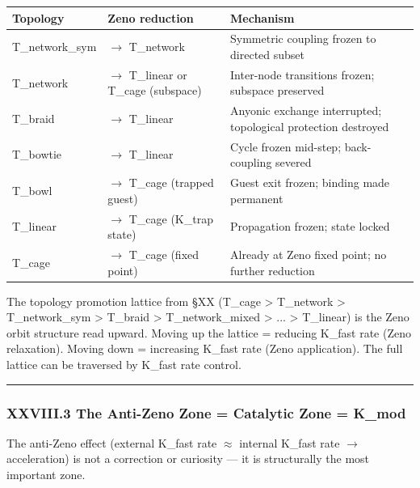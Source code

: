 \documentclass[12pt,a4paper]{article}
\begin{document}
\begin{table}[htbp]
\centering
\small
{}
\begin{tabularx}{\textwidth}{>{\centering\arraybackslash}X >{\centering\arraybackslash}X >{\centering\arraybackslash}X}
\toprule
\rowcolor{gray!25}\textbf{Topology} & \textbf{Zeno reduction} & \textbf{Mechanism} \\
\midrule
\rowcolors{1}{white}{gray!10}
T\_network\_sym & $\rightarrow$ T\_network & Symmetric coupling frozen to directed subset \\
T\_network & $\rightarrow$ T\_linear or T\_cage (subspace) & Inter-node transitions frozen; subspace preserved \\
T\_braid & $\rightarrow$ T\_linear & Anyonic exchange interrupted; topological protection destroyed \\
T\_bowtie & $\rightarrow$ T\_linear & Cycle frozen mid-step; back-coupling severed \\
T\_bowl & $\rightarrow$ T\_cage (trapped guest) & Guest exit frozen; binding made permanent \\
T\_linear & $\rightarrow$ T\_cage (K\_trap state) & Propagation frozen; state locked \\
T\_cage & $\rightarrow$ T\_cage (fixed point) & Already at Zeno fixed point; no further reduction \\
\bottomrule
\end{tabularx}
\end{table}

The topology promotion lattice from §XX (T\_cage \textgreater{} T\_network \textgreater{} T\_network\_sym \textgreater{} T\_braid \textgreater{} T\_network\_mixed \textgreater{} ... \textgreater{} T\_linear) is the Zeno orbit structure read upward. Moving up the lattice = reducing K\_fast rate (Zeno relaxation). Moving down = increasing K\_fast rate (Zeno application). The full lattice can be traversed by K\_fast rate control.

\begin{center}
\rule{0.5\textwidth}{0.4pt}
\end{center}

\subsubsection{XXVIII.3 The Anti-Zeno Zone = Catalytic Zone = K\_mod}

The anti-Zeno effect (external K\_fast rate $\approx$ internal K\_fast rate $\rightarrow$ acceleration) is not a correction or curiosity --- it is structurally the most important zone.
\end{document}
